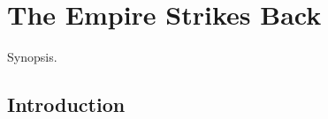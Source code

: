 \chapter{The Empire Strikes Back}

\graphicspath{{figures/chapter-6/}}


\begin{synopsis}
	Synopsis.
\end{synopsis}


\section{Introduction}

\lipsum[100]
\cite{Salmon2006}

